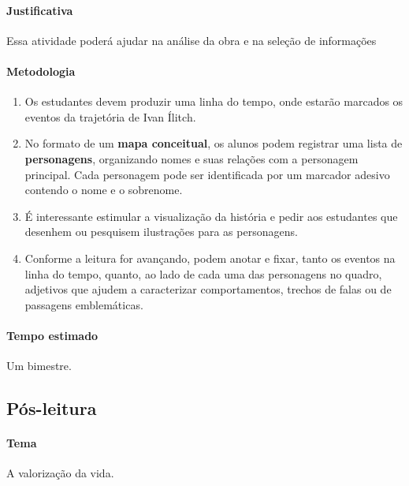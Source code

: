 \documentclass[12pt]{extarticle}
\begin{document}
\paragraph{Justificativa} Essa atividade poderá ajudar na análise 
da obra e na seleção de informações

\paragraph{Metodologia}

\begin{enumerate}

\item Os estudantes devem produzir uma linha do
tempo, onde estarão marcados os eventos da trajetória de Ivan Ílitch.

\item No formato de um \textbf{mapa conceitual}, os alunos podem 
registrar uma lista de \textbf{personagens}, organizando nomes e suas
relações com a personagem principal. Cada personagem pode ser
identificada por um marcador adesivo contendo o nome e o sobrenome.

\item É interessante estimular a visualização da história e pedir aos estudantes
que desenhem ou pesquisem ilustrações para as personagens.

\item Conforme a leitura for avançando, podem anotar e fixar, tanto os eventos na linha do
tempo, quanto, ao lado de cada uma das personagens no quadro, adjetivos
que ajudem a caracterizar comportamentos, trechos de falas ou de
passagens emblemáticas.

\end{enumerate}

\paragraph{Tempo estimado} Um bimestre.


\subsection{Pós-leitura}




\paragraph{Tema} A valorização da vida.
\end{document}
